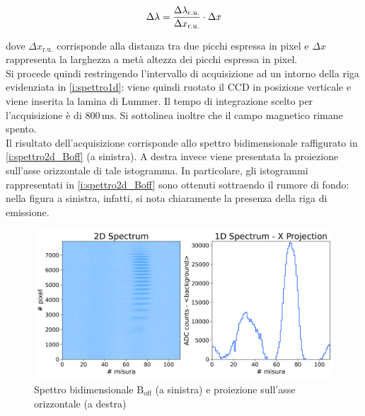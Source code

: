 \documentclass[twocolumn,10pt]{asme2ej}
\begin{document}
\vspace{-15pt}
\begin{equation}
    \Delta\lambda = \frac{\Delta\lambda_{\text{r.u.}}}{\Delta x_{\text{r.u.}}} \cdot \Delta x
    \label{e:dlambda}
\vspace{-5pt}
\end{equation}

dove $\Delta x_{\text{r.u.}}$ corrisponde alla distanza tra due picchi espressa in pixel e $\Delta x$ rappresenta la
larghezza a metà altezza dei picchi espressa in pixel.  \\

Si procede quindi restringendo l'intervallo di acquisizione ad un intorno della riga evidenziata in
\autoref{i:spettro1d}: viene quindi ruotato il CCD in posizione verticale e viene inserita la lamina di Lummer. Il tempo
di integrazione scelto per l'acquisizione è di $800\,\si{\milli\second}$. Si sottolinea inoltre che il campo magnetico
rimane spento. \\
Il risultato dell'acquisizione corrisponde allo spettro bidimensionale raffigurato in \autoref{i:spettro2d_Boff} (a
sinistra). A destra invece viene presentata la proiezione sull'asse orizzontale di tale istogramma. In particolare, gli
istogrammi rappresentati in \autoref{i:spettro2d_Boff} sono ottenuti sottraendo il rumore di fondo: nella figura a
sinistra, infatti, si nota chiaramente la presenza della riga di emissione.




\begin{figure}
    \centering
    \includegraphics[width=\linewidth]{../Plots/Boff_2d_spectrum.png}
    \caption{Spettro bidimensionale $\text{B}_{\text{off}}$ (a sinistra) e proiezione sull'asse orizzontale (a destra)}
    \label{i:spettro2d_Boff}
\end{figure}

\end{document}
